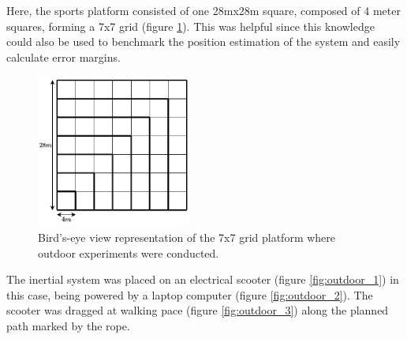 Here, the sports platform consisted of one 28mx28m square, composed of 4 meter squares, forming a 7x7 grid (figure \ref{fig:platform_representation}). This was helpful since this knowledge could also be used to benchmark the position estimation of the system and easily calculate error margins.

\begin{figure}[!h]
    \centering
    \includegraphics[width=0.45\textwidth]{figures/square.pdf}
    \caption{ Bird's-eye view representation of the 7x7 grid platform where outdoor experiments were conducted. }
    \label{fig:platform_representation}
\end{figure}





The inertial system was placed on an electrical scooter (figure \ref{fig:outdoor_1}) in this case, being powered by a laptop computer (figure \ref{fig:outdoor_2}). The scooter was dragged at walking pace (figure \ref{fig:outdoor_3}) along the planned path marked by the rope.

